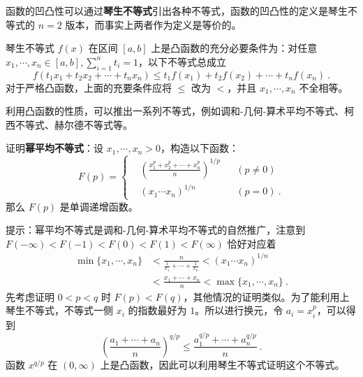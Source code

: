 函数的凹凸性可以通过\textbf{琴生不等式}引出各种不等式，函数的凹凸性的定义是琴生不等式的 $n=2$ 版本，而事实上两者作为定义是等价的。
\begin{theorem}{琴生不等式}
$f(x)$ 在区间 $[a,b]$ 上是凸函数的充分必要条件为：对任意 $x_1,\cdots,x_n\in [a,b],\sum_{i=1}^n t_i=1$，以下不等式总成立
\begin{equation}
f(t_1x_1+t_2x_2+\cdots+t_nx_n)\le t_1f(x_1)+t_2f(x_2)+\cdots+t_nf(x_n)~.
\end{equation}
对于严格凸函数，上面的充要条件应将 $\le$ 改为 $<$，并且 $x_1,\cdots,x_n$ 不全相等。
\end{theorem}
利用凸函数的性质，可以推出一系列不等式，例如调和-几何-算术平均不等式、柯西不等式、赫尔德不等式等。
\begin{exercise}{}
证明\textbf{幂平均不等式}：设 $x_1,\cdots,x_n>0$，构造以下函数：
\begin{equation}
F(p)=\left\{
\begin{aligned}
&\left(\frac{x_1^p+x_2^p+\cdots+x_n^p}{n}\right)^{1/p} && (p\neq 0)\\
&(x_1\cdots x_n)^{1/n} && (p=0)~.
\end{aligned}
\right.
\end{equation}
那么 $F(p)$ 是单调递增函数。
\end{exercise}
提示：幂平均不等式是调和-几何-算术平均不等式的自然推广，注意到 $F(-\infty)<F(-1)<F(0)<F(1)<F(\infty)$ 恰好对应着
\begin{equation}
\begin{aligned}
\min\{x_1,\cdots,x_n\}&<\frac{n}{\frac{1}{x_1}+\cdots+\frac{1}{x_n}}<(x_1\cdots x_n)^{1/n}\\
&<\frac{x_1+\cdots+x_n}{n}<\max\{x_1,\cdots,x_n\}~.
\end{aligned}
\end{equation}
先考虑证明 $0<p<q$ 时 $F(p)<F(q)$，其他情况的证明类似。为了能利用上琴生不等式，不等式一侧 $x_i$ 的指数最好为 $1$。所以进行换元，令 $a_i=x_i^p$，可以得到
\begin{equation}
\left(\frac{a_1+\cdots+a_n}{n}\right)^{q/p}\le \frac{a_1^{q/p}+\cdots+a_n^{q/p}}{n}~.
\end{equation}
函数 $x^{q/p}$ 在 $(0,\infty)$ 上是凸函数，因此可以利用琴生不等式证明这个不等式。

